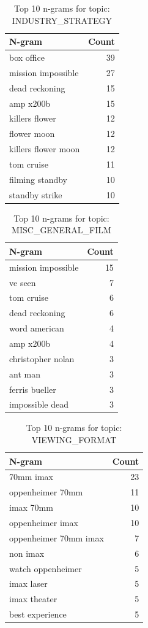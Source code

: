\begin{table}[h]
\centering
\caption{Top 10 n-grams for topic: INDUSTRY_STRATEGY}
\begin{tabular}{lr}
\hline
N-gram & Count \\
\hline
box office & 39 \\
mission impossible & 27 \\
dead reckoning & 15 \\
amp x200b & 15 \\
killers flower & 12 \\
flower moon & 12 \\
killers flower moon & 12 \\
tom cruise & 11 \\
filming standby & 10 \\
standby strike & 10 \\
\hline
\end{tabular}
\end{table}

\begin{table}[h]
\centering
\caption{Top 10 n-grams for topic: MISC_GENERAL_FILM}
\begin{tabular}{lr}
\hline
N-gram & Count \\
\hline
mission impossible & 15 \\
ve seen & 7 \\
tom cruise & 6 \\
dead reckoning & 6 \\
word american & 4 \\
amp x200b & 4 \\
christopher nolan & 3 \\
ant man & 3 \\
ferris bueller & 3 \\
impossible dead & 3 \\
\hline
\end{tabular}
\end{table}

\begin{table}[h]
\centering
\caption{Top 10 n-grams for topic: VIEWING_FORMAT}
\begin{tabular}{lr}
\hline
N-gram & Count \\
\hline
70mm imax & 23 \\
oppenheimer 70mm & 11 \\
imax 70mm & 10 \\
oppenheimer imax & 10 \\
oppenheimer 70mm imax & 7 \\
non imax & 6 \\
watch oppenheimer & 5 \\
imax laser & 5 \\
imax theater & 5 \\
best experience & 5 \\
\hline
\end{tabular}
\end{table}

